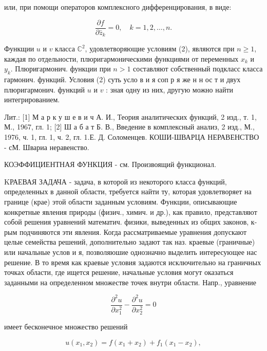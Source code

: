 \documentclass[10pt]{article}
\begin{document}
или, при помощи операторов комплексного дифференцирования, в виде:



\[

\frac{\partial f}{\partial \bar{z}_{k}}=0, \quad k=1,2, \ldots, n .

\]



Функщии $u$ и $v$ класса $\mathbb{C}^{2}$, удовлетворяющие условиям (2), являются при $n \geqslant 1$, каждая по отдельности, плюригармоническими функциями от переменных $x_{k}$ и $y_{k}$. Плюригармонич. функции при $n>1$ составляют собственный подкласс класса гармонич. функций. Условия (2) суть усло в и я соп р я же н н ос т и двух плюригармонич. функций $u$ и $v$ : зная одну из них, другую можно найти интегрированием.



Лит.: [1] М а р к у ш е в и ч А. И., Теория аналитических функций, 2 изд., т. 1, М., 1967, гл. 1; [2] Ш а б а т Б. В., Введение в комплексный анализ, 2 изд., М., 1976, ч. 1, гл. 1, ч. 2, гл. 1.Е. Д. Соломенцев. КОШИ-ШВАРЦА НЕРАВЕНСТВО - сМ. Швариа неравенство.



КОЭФФИЦИЕНТНАЯ ФУНКЦИЯ - см. Произвоящий функционал.



KРАЕВАЯ ЗАДАЧА - задача, в которой из некоторого класса функций, определенных в данной области, требуется найти ту, которая удовлетворяет на границе (крае) этой области заданным условиям. Функции, описывающие конкретные явления природы (физич., химич. и др.), как правило, представляют собой решения уравнений математич. физики, выведенных из общих законов, к-рым подчиняются эти явления. Когда рассматриваемые уравнения допускают целые семейства решений, дополнительно задают так наз. краевые (граничные) или начальные услов и я, позволяюшие однозначно выделить интересующее нас решение. В то время как краевые условия задаются исключительно на граничных точках области, где ищется решение, начальные условия могут оказаться заданными на определенном множестве точек внутри области. Напр., уравнение



\[

\frac{\partial^{2} u}{\partial x_{1}^{2}}-\frac{\partial^{2} u}{\partial x_{2}^{2}}=0

\]



имеет бесконечное множество решений



\[

u\left(x_{1}, x_{2}\right)=f\left(x_{1}+x_{2}\right)+f_{1}\left(x_{1}-x_{2}\right),

\]
\end{document}
